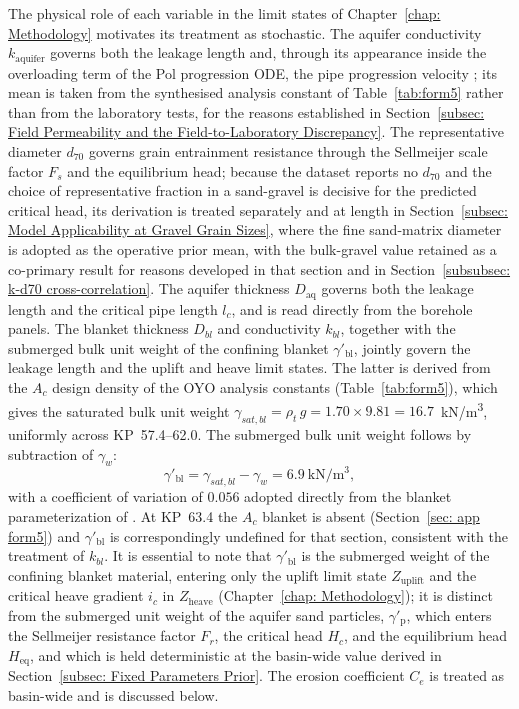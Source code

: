The physical role of each variable in the limit states of Chapter~\ref{chap: Methodology} motivates its treatment as stochastic. The aquifer conductivity $k_\mathrm{aquifer}$ governs both the leakage length and, through its appearance inside the overloading term of the Pol progression ODE, the pipe progression velocity \parencite{pol_compgeo_2024}; its mean is taken from the synthesised analysis constant of Table~\ref{tab:form5} rather than from the laboratory tests, for the reasons established in Section~\ref{subsec: Field Permeability and the Field-to-Laboratory Discrepancy}. The representative diameter $d_{70}$ governs grain entrainment resistance through the Sellmeijer scale factor $F_s$ and the equilibrium head; because the dataset reports no $d_{70}$ and the choice of representative fraction in a sand-gravel is decisive for the predicted critical head, its derivation is treated separately and at length in Section~\ref{subsec: Model Applicability at Gravel Grain Sizes}, where the fine sand-matrix diameter is adopted as the operative prior mean, with the bulk-gravel value retained as a co-primary result for reasons developed in that section and in Section~\ref{subsubsec: k-d70 cross-correlation}. The aquifer thickness $D_\mathrm{aq}$ governs both the leakage length and the critical pipe length $l_c$, and is read directly from the borehole panels. The blanket thickness $D_{bl}$ and conductivity $k_{bl}$, together with the submerged bulk unit weight of the confining blanket $\gamma'_\mathrm{bl}$, jointly govern the leakage length and the uplift and heave limit states. The latter is derived from the $A_c$ design density of the OYO analysis constants (Table~\ref{tab:form5}), which gives the saturated bulk unit weight $\gamma_{sat,bl} = \rho_t\, g = 1.70 \times 9.81 = 16.7$~kN/m\textsuperscript{3}, uniformly across KP~57.4--62.0. The submerged bulk unit weight follows by subtraction of $\gamma_w$:
\begin{equation}
\gamma'_\mathrm{bl} = \gamma_{sat,bl} - \gamma_w = 6.9~\mathrm{kN/m^3},
\end{equation}
with a coefficient of variation of $0.056$ adopted directly from the blanket parameterization of \textcite{pol_sie_2024}. At KP~63.4 the $A_c$ blanket is absent (Section~\ref{sec: app form5}) and $\gamma'_\mathrm{bl}$ is correspondingly undefined for that section, consistent with the treatment of $k_{bl}$. It is essential to note that $\gamma'_\mathrm{bl}$ is the submerged weight of the confining blanket material, entering only the uplift limit state $Z_\mathrm{uplift}$ and the critical heave gradient $i_c$ in $Z_\mathrm{heave}$ (Chapter~\ref{chap: Methodology}); it is distinct from the submerged unit weight of the aquifer sand particles, $\gamma'_\mathrm{p}$, which enters the Sellmeijer resistance factor $F_r$, the critical head $H_c$, and the equilibrium head $H_\mathrm{eq}$, and which is held deterministic at the basin-wide value derived in Section~\ref{subsec: Fixed Parameters Prior}. The erosion coefficient $C_e$ is treated as basin-wide and is discussed below.


